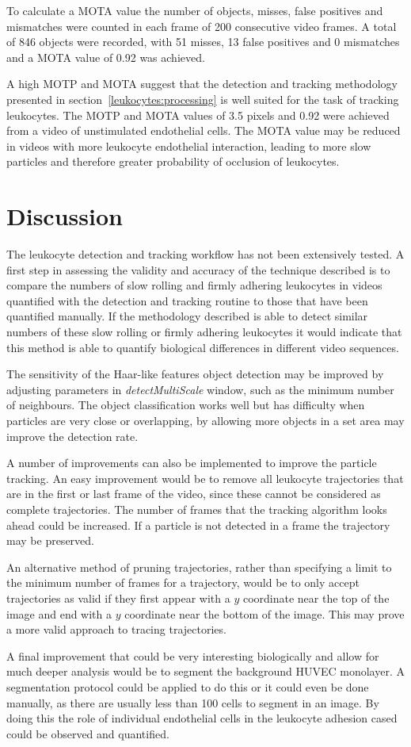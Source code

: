 To calculate a MOTA value the number of objects, misses, false positives and mismatches were counted in each frame of 200 consecutive video frames. A total of 846 objects were recorded, with 51 misses, 13 false positives and 0 mismatches and a MOTA value of 0.92 was achieved.

A high MOTP and MOTA suggest that the detection and tracking methodology presented in section~\ref{leukocytes:processing} is well suited for the task of tracking leukocytes. The MOTP and MOTA values of 3.5 pixels and 0.92 were achieved from a video of unstimulated endothelial cells. The MOTA value may be reduced in videos with more leukocyte endothelial interaction, leading to more slow particles and therefore greater probability of occlusion of leukocytes.

\section{Discussion}
\label{leukocytes:discussion}
The leukocyte detection and tracking workflow has not been extensively tested. A first step in assessing the validity and accuracy of the technique described is to compare the numbers of slow rolling and firmly adhering leukocytes in videos quantified with the detection and tracking routine to those that have been quantified manually. If the methodology described is able to detect similar numbers of these slow rolling or firmly adhering leukocytes it would indicate that this method is able to quantify biological differences in different video sequences.

The sensitivity of the Haar-like features object detection may be improved by adjusting parameters in \emph{detectMultiScale} window, such as the minimum number of neighbours. The object classification works well but has difficulty when particles are very close or overlapping, by allowing more objects in a set area may improve the detection rate.

A number of improvements can also be implemented to improve the particle tracking. An easy improvement would be to remove all leukocyte trajectories that are in the first or last frame of the video, since these cannot be considered as complete trajectories. The number of frames that the tracking algorithm looks ahead could be increased. If a particle is not detected in a frame the trajectory may be preserved.

An alternative method of pruning trajectories, rather than specifying a limit to the minimum number of frames for a trajectory, would be to only accept trajectories as valid if they first appear with a $y$ coordinate near the top of the image and end with a $y$ coordinate near the bottom of the image. This may prove a more valid approach to tracing trajectories.

A final improvement that could be very interesting biologically and allow for much deeper analysis would be to segment the background HUVEC monolayer. A segmentation protocol could be applied to do this or it could even be done manually, as there are usually less than 100 cells to segment in an image. By doing this the role of individual endothelial cells in the leukocyte adhesion cased could be observed and quantified. 

